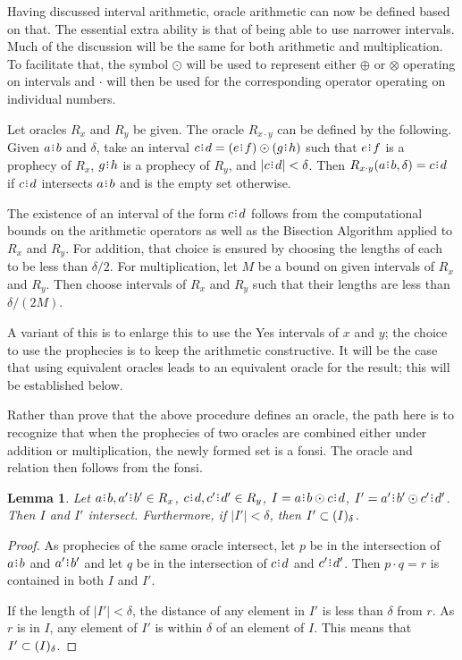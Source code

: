 \documentclass[12pt]{article}
\newtheorem{lemma}{Lemma}[section]
\begin{document}
Having discussed interval arithmetic, oracle arithmetic can now be defined based on that. The essential extra ability is that of being able to use narrower intervals. Much of the discussion will be the same for both arithmetic and multiplication. To facilitate that, the symbol $\odot$ will be used to represent either $\oplus$ or $\otimes$ operating on intervals and $\cdot$ will then be used for the corresponding operator operating on individual numbers.

Let oracles $R_x$ and $R_y$ be given. The oracle $R_{x \cdot y}$ can be defined by the following. Given $a\rint b$ and $\delta$, take an interval $c\rint d = (e\rint f) \odot (g\rint h)$ such that $e\rint f$ is a prophecy of $R_x$, $g\rint h$ is a prophecy of $R_y$, and $|c\rint d| < \delta$. Then $R_{x \cdot y}(a\rint b, \delta) = c\rint d$ if $c\rint d$ intersects $a\rint b$ and is the empty set otherwise. 

The existence of an interval of the form $c\rint d$ follows from the computational bounds on the arithmetic operators as well as the Bisection Algorithm applied to $R_x$ and $R_y$. For addition, that choice is ensured by choosing the lengths of each to be less than $\delta/2$. For multiplication, let $M$ be a bound on given intervals of $R_x$ and $R_y$. Then choose intervals of $R_x$ and $R_y$ such that their lengths are less than $\delta/(2M)$. 

A variant of this is to enlarge this to use the Yes intervals of $x$ and $y$; the choice to use the prophecies is to keep the arithmetic constructive. It will be the case that using equivalent oracles leads to an equivalent oracle for the result; this will be established below. 

Rather than prove that the above procedure defines an oracle, the path here is to recognize that when the prophecies of two oracles are combined either under addition or multiplication, the newly formed set is a fonsi. The oracle and relation then follows from the fonsi. 

\begin{lemma}
    Let $a\rint b, a'\rint b' \in R_{x}$, $c\rint d, c'\rint d' \in R_y$, $I =  a\rint b \odot c\rint d$, $I' =  a'\rint b' \odot c'\rint d'$. Then $I$ and $I'$ intersect. Furthermore, if $|I'| < \delta$, then $I' \subset (I)_{\delta}$.
\end{lemma}

\begin{proof}   
    As prophecies of the same oracle intersect, let $p$ be in the intersection of $a\rint b$ and $a'\rint b'$ and let $q$ be in the intersection of $c\rint d$ and $c'\rint d'$. Then $p \cdot q = r$ is contained in both $I$ and $I'$. 
    
    If the length of $|I'| < \delta$, the distance of any element in $I'$ is less than $\delta$ from $r$. As $r$ is in $I$, any element of $I'$ is within $\delta$ of an element of $I$. This means that $I' \subset (I)_{\delta}$.
\end{proof}
\end{document}
